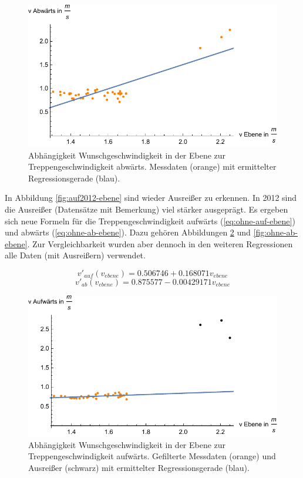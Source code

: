 \begin{figure} \centering 
	\includegraphics[]{abbildungen/regression/2012/ab-ebene.pdf}
	
	\caption{Abhängigkeit Wunschgeschwindigkeit in der Ebene zur Treppengeschwindigkeit abwärts. Messdaten (orange) mit ermittelter Regressionsgerade (blau). \label{fig:ab2012-ebene}}
\end{figure}

In Abbildung \ref{fig:auf2012-ebene} sind wieder Ausreißer zu erkennen. In 2012 sind die Ausreißer (Datensätze mit Bemerkung) viel stärker ausgeprägt. Es ergeben sich neue Formeln für die Treppengeschwindigkeit aufwärts (\ref{eq:ohne-auf-ebene}) und abwärts (\ref{eq:ohne-ab-ebene}). Dazu gehören Abbildungen \ref{fig:ohne-auf-ebene} und \ref{fig:ohne-ab-ebene}.
Zur Vergleichbarkeit wurden aber dennoch in den weiteren Regressionen alle Daten (mit Ausreißern) verwendet.


\begin{equation} \label{eq:ohne-auf-ebene}
	v'_{auf}(v_{ebene}) = 0.506746 + 0.168071  v_{ebene}
\end{equation}
\begin{equation} \label{eq:ohne-ab-ebene}
	v'_{ab}(v_{ebene}) = 0.875577 - 0.00429171 v_{ebene}
\end{equation}

\begin{figure} \centering 
	\includegraphics[]{abbildungen/regression/2012/ohneausreisser/auf-ebene.pdf}
	
	\caption{Abhängigkeit Wunschgeschwindigkeit in der Ebene zur Treppengeschwindigkeit aufwärts. Gefilterte Messdaten (orange) und Ausreißer (schwarz) mit ermittelter Regressionsgerade (blau). \label{fig:ohne-auf-ebene}}
\end{figure}

